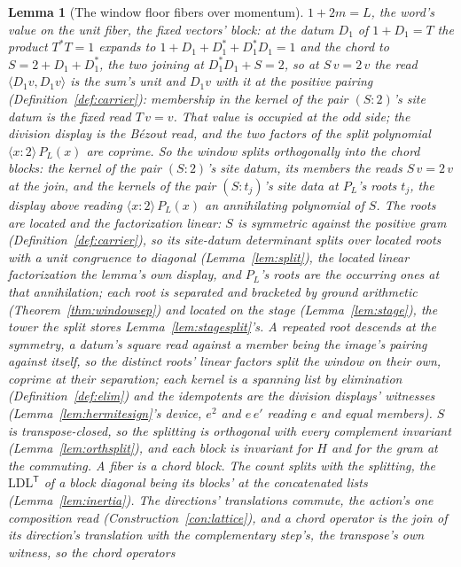 \documentclass[11pt]{article}
\newtheorem{lemma}{Lemma}
\theoremstyle{definition}
\begin{document}
\begin{lemma}[The window floor fibers over momentum]
$1+2m=L$, the word's value on the \emph{unit fiber}, the fixed
vectors' block: at the datum $D_1$ of $1+D_1=T$ the product
$T^{*}T=1$ expands to
$1+D_1+D_1^{*}+D_1^{*}D_1=1$ and the chord to
$S=2+D_1+D_1^{*}$, the two joining at
$D_1^{*}D_1+S=2$, so at $S\,v=2\,v$ the read
$\langle D_1v,D_1v\rangle$ is the sum's unit and $D_1v$ with it at
the positive pairing (Definition~\ref{def:carrier}): membership in
the kernel of the pair $(S\!:\!2)$'s site datum is the fixed read
$T\,v=v$. That value is occupied at the odd
side; the division display is the B\'ezout read, and the two factors
of the split polynomial $\langle x\!:\!2\rangle\,P_L(x)$ are coprime.
So the window splits orthogonally into the \emph{chord blocks}: the
kernel of the pair $(S\!:\!2)$'s site datum, its members the reads
$S\,v=2\,v$ at the join, and the kernels of the pair
$(S\!:\!t_j)$'s site data at $P_L$'s roots $t_j$, the display above
reading $\langle x\!:\!2\rangle\,P_L(x)$ an annihilating polynomial
of $S$. The roots are located and the factorization linear: $S$ is
symmetric against the positive gram
(Definition~\ref{def:carrier}), so its site-datum determinant
splits over located roots with a unit congruence to diagonal
(Lemma~\ref{lem:split}), the located linear factorization the
lemma's own display, and $P_L$'s roots are the occurring ones at
that annihilation; each root is separated and bracketed by
ground arithmetic (Theorem~\ref{thm:windowsep}) and located on the
stage (Lemma~\ref{lem:stage}), the tower the split stores
Lemma~\ref{lem:stagesplit}'s. A repeated root descends at the
symmetry, a datum's square read against a member being the image's
pairing against itself, so the distinct roots' linear factors split
the window on their own, coprime at their separation; each kernel is
a spanning list by elimination (Definition~\ref{def:elim}) and the
idempotents are the division displays' witnesses
(Lemma~\ref{lem:hermitesign}'s device, $e^2$ and $e\,e'$ reading $e$
and equal members). $S$ is transpose-closed, so the splitting is
orthogonal with every complement invariant
(Lemma~\ref{lem:orthsplit}), and each block is invariant for $H$ and
for the gram at the commuting. A \emph{fiber} is a chord block. The
count splits with the splitting, the
$\mathrm{LDL}^{\mathsf T}$ of a block diagonal being its blocks' at
the concatenated lists
(Lemma~\ref{lem:inertia}). The directions' translations commute,
the action's one composition read
(Construction~\ref{con:lattice}), and a chord operator is the
join of its direction's translation with the complementary
step's, the transpose's own witness, so the chord operators

\end{lemma}
\end{document}
